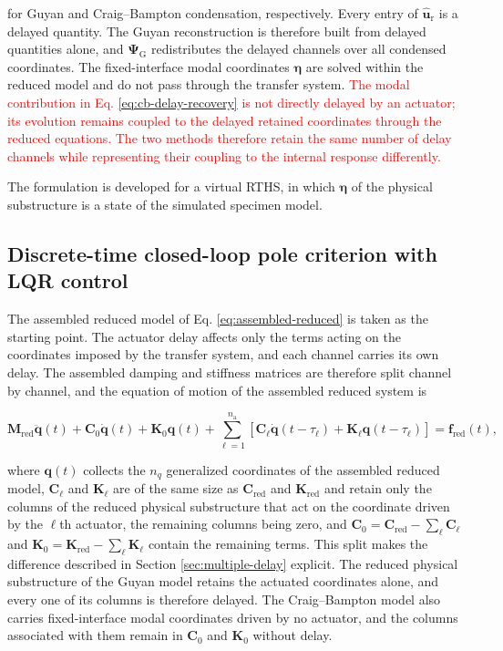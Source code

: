 \documentclass[a4paper,fleqn,review,12pt]{cas-sc}
\numberwithin{equation}{section}
\newcommand{\rev}[1]{\textcolor{red}{#1}}
\begin{document}
for Guyan and Craig--Bampton condensation, respectively. Every entry of \(\hat{\bm{u}}_{\mathrm{r}}\) is a delayed quantity. The Guyan reconstruction is therefore built from delayed quantities alone, and \(\bm{\Psi}_{\mathrm{G}}\) redistributes the delayed channels over all condensed coordinates. The fixed-interface modal coordinates \(\bm{\eta}\) are solved within the reduced model and do not pass through the transfer system. \rev{The modal contribution in Eq. \eqref{eq:cb-delay-recovery} is not directly delayed by an actuator; its evolution remains coupled to the delayed retained coordinates through the reduced equations.} \rev{The two methods therefore retain the same number of delay channels while representing their coupling to the internal response differently.}

The formulation is developed for a virtual RTHS, in which \(\bm{\eta}\) of the physical substructure is a state of the simulated specimen model.

\subsection{Discrete-time closed-loop pole criterion with LQR control}
\label{sec:pole-criterion}

The assembled reduced model of Eq. \eqref{eq:assembled-reduced} is taken as the starting point. The actuator delay affects only the terms acting on the coordinates imposed by the transfer system, and each channel carries its own delay. The assembled damping and stiffness matrices are therefore split channel by channel, and the equation of motion of the assembled reduced system is

\vspace{-3.5em}
\begin{equation}
	\mathbf{M}_{\mathrm{red}}\ddot{\bm{q}}(t)+\mathbf{C}_{0}\dot{\bm{q}}(t)+\mathbf{K}_{0}\bm{q}(t)
	+\sum_{\ell=1}^{n_{\mathrm{a}}}
	\left[
	\mathbf{C}_{\ell}\dot{\bm{q}}(t-\tau_{\ell})
	+\mathbf{K}_{\ell}\bm{q}(t-\tau_{\ell})
	\right]
	=\bm{f}_{\mathrm{red}}(t),
	\label{eq:delayed-eom}
\end{equation}
\vspace{-3.5em}

\noindent where \(\bm{q}(t)\) collects the \(n_{q}\) generalized coordinates of the assembled reduced model, \(\mathbf{C}_{\ell}\) and \(\mathbf{K}_{\ell}\) are of the same size as \(\mathbf{C}_{\mathrm{red}}\) and \(\mathbf{K}_{\mathrm{red}}\) and retain only the columns of the reduced physical substructure that act on the coordinate driven by the \(\ell\)th actuator, the remaining columns being zero, and \(\mathbf{C}_{0}=\mathbf{C}_{\mathrm{red}}-\sum_{\ell}\mathbf{C}_{\ell}\) and \(\mathbf{K}_{0}=\mathbf{K}_{\mathrm{red}}-\sum_{\ell}\mathbf{K}_{\ell}\) contain the remaining terms. This split makes the difference described in Section \ref{sec:multiple-delay} explicit. The reduced physical substructure of the Guyan model retains the actuated coordinates alone, and every one of its columns is therefore delayed. The Craig--Bampton model also carries fixed-interface modal coordinates driven by no actuator, and the columns associated with them remain in \(\mathbf{C}_{0}\) and \(\mathbf{K}_{0}\) without delay.
\end{document}
